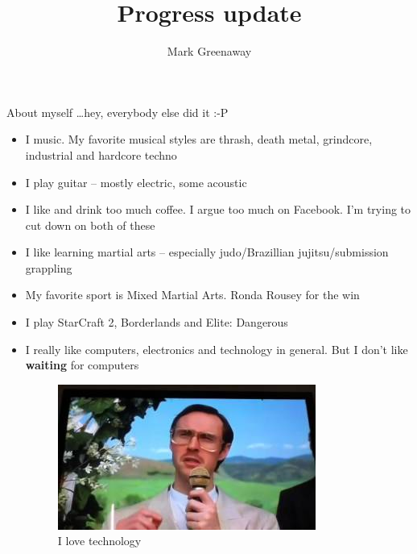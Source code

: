 \documentclass{beamer}
\title{Progress update}
\author{Mark Greenaway}
\begin{document}
\begin{frame}
\titlepage
\end{frame}

\begin{frame}{About myself \ldots hey, everybody else did it :-P}
\begin{itemize}
\item I \Heart \hspace{0.01cm} music. My favorite musical styles are thrash, death metal, grindcore, industrial and hardcore techno
\item I play guitar -- mostly electric, some acoustic
\item I like and drink too much coffee. I argue too much on Facebook. I'm trying to cut down on both of
			these
\item I like learning martial arts -- especially judo/Brazillian jujitsu/submission grappling
\item My favorite sport is Mixed Martial Arts. Ronda Rousey for the win
\item I play StarCraft 2, Borderlands and Elite: Dangerous %
\item I really like computers, electronics and technology in general. But I don't like \textbf{waiting}
			for computers
\begin{figure}
\caption{\twonotes \hspace{0.16cm}I love technology \twonotes}
\includegraphics[scale=.25]{i_love_technology.jpg}
\end{figure}
\end{itemize}
\end{frame}
\end{document}
